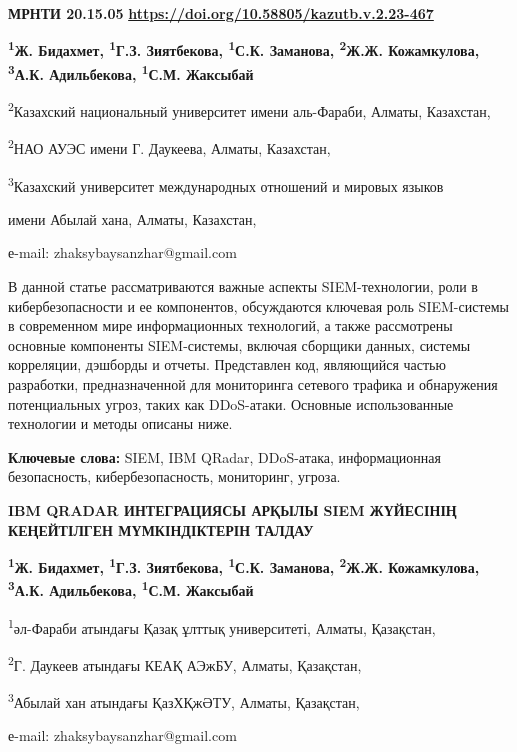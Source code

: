 \newpage
{}
{\bfseries МРНТИ 20.15.05}
\hfill {\bfseries \href{https://doi.org/10.58805/kazutb.v.2.23-467}{https://doi.org/10.58805/kazutb.v.2.23-467}}


\begin{center}
{\bfseries \textsuperscript{1}Ж. Бидахмет, \textsuperscript{1}Г.З.
Зиятбекова\envelope, \textsuperscript{1}С.К. Заманова, \textsuperscript{2}Ж.Ж.
Кожамкулова, \textsuperscript{3}А.К. Адильбекова, \textsuperscript{1}С.М.
Жаксыбай}

\textsuperscript{2}Казахский национальный университет имени аль-Фараби,
Алматы, Казахстан,

\textsuperscript{2}НАО АУЭС имени Г. Даукеева, Алматы, Казахстан,

\textsuperscript{3}Казахский университет международных отношений и
мировых языков

имени Абылай хана, Алматы, Казахстан,

е-mail: zhaksybaysanzhar@gmail.com
\end{center}

В данной статье рассматриваются важные аспекты SIEM-технологии, роли в
кибербезопасности и ее компонентов, обсуждаются ключевая роль
SIEM-системы в современном мире информационных технологий, а также
рассмотрены основные компоненты SIEM-системы, включая сборщики данных,
системы корреляции, дэшборды и отчеты. Представлен код, являющийся
частью разработки, предназначенной для мониторинга сетевого трафика и
обнаружения потенциальных угроз, таких как DDoS-атаки. Основные
использованные технологии и методы описаны ниже.

{\bfseries Ключевые слова:} SIEM, IBM QRadar, DDoS-атака, информационная
безопасность, кибербезопасность, мониторинг, угроза.

\begin{center}
{\large\bfseries IBM QRADAR ИНТЕГРАЦИЯСЫ АРҚЫЛЫ SIEM ЖҮЙЕСІНІҢ КЕҢЕЙТІЛГЕН
МҮМКІНДІКТЕРІН ТАЛДАУ}

{\bfseries \textsuperscript{1}Ж. Бидахмет, \textsuperscript{1}Г.З.
Зиятбекова\envelope, \textsuperscript{1}С.К. Заманова, \textsuperscript{2}Ж.Ж.
Кожамкулова, \textsuperscript{3}А.К. Адильбекова, \textsuperscript{1}С.М.
Жаксыбай}

\textsuperscript{1}әл-Фараби атындағы Қазақ ұлттық университеті, Алматы,
Қазақстан,

\textsuperscript{2}Г. Даукеев атындағы КЕАҚ АЭжБУ, Алматы, Қазақстан,

\textsuperscript{3}Абылай хан атындағы ҚазХҚжӘТУ, Алматы, Қазақстан,

е-mail: zhaksybaysanzhar@gmail.com
\end{center}


